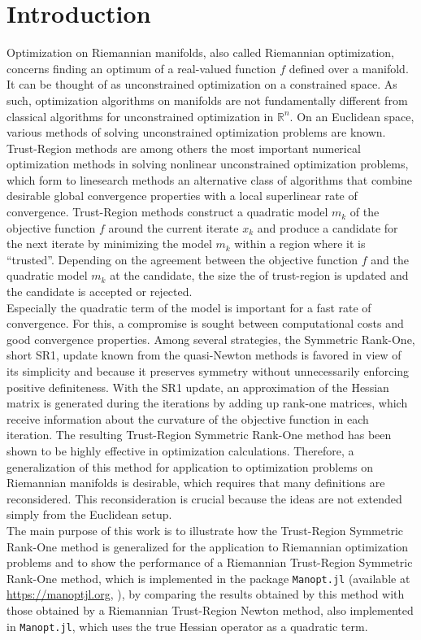 \chapter{Introduction}

Optimization on Riemannian manifolds, also called Riemannian optimization, concerns finding an optimum of a real-valued function $f$ defined over a manifold. It can be thought of as unconstrained optimization on a constrained space. As such, optimization algorithms on manifolds are not fundamentally different from classical algorithms for unconstrained optimization in $\mathbb{R}^n$. On an Euclidean space, various methods of solving unconstrained optimization problems are known. \\
Trust-Region methods are among others the most important numerical optimization methods in solving nonlinear unconstrained optimization problems, which form to linesearch methods an alternative class of algorithms that combine desirable global convergence properties with a local superlinear rate of convergence. Trust-Region methods construct a quadratic model $m_k$ of the objective function $f$ around the current iterate $x_k$ and produce a candidate for the next iterate by minimizing the model $m_k$ within a region where it is “trusted”. Depending on the agreement between the objective function $f$ and the quadratic model $m_k$ at the candidate, the size the of trust-region is updated and the candidate is accepted or rejected. \\
Especially the quadratic term of the model is important for a fast rate of convergence. For this, a compromise is sought between computational costs and good convergence properties. Among several strategies, the Symmetric Rank-One, short SR1, update known from the quasi-Newton methods is favored in view of its simplicity and because it preserves symmetry without unnecessarily enforcing positive definiteness. With the SR1 update, an approximation of the Hessian matrix is generated during the iterations by adding up rank-one matrices, which receive information about the curvature of the objective function in each iteration. The resulting Trust-Region Symmetric Rank-One method has been shown to be highly effective in optimization calculations. Therefore, a generalization of this method for application to optimization problems on Riemannian manifolds is desirable, which requires that many definitions are reconsidered. This reconsideration is crucial because the ideas are not extended simply from the Euclidean setup. \\
The main purpose of this work is to illustrate how the Trust-Region Symmetric Rank-One method is generalized for the application to Riemannian optimization problems and to show the performance of a Riemannian Trust-Region Symmetric Rank-One method, which is implemented in the package \lstinline!Manopt.jl! (available at \url{https://manoptjl.org}, \cite{Bergmann:2019}), by comparing the results obtained by this method with those obtained by a Riemannian Trust-Region Newton method, also implemented in \lstinline!Manopt.jl!, which uses the true Hessian operator as a quadratic term. 


